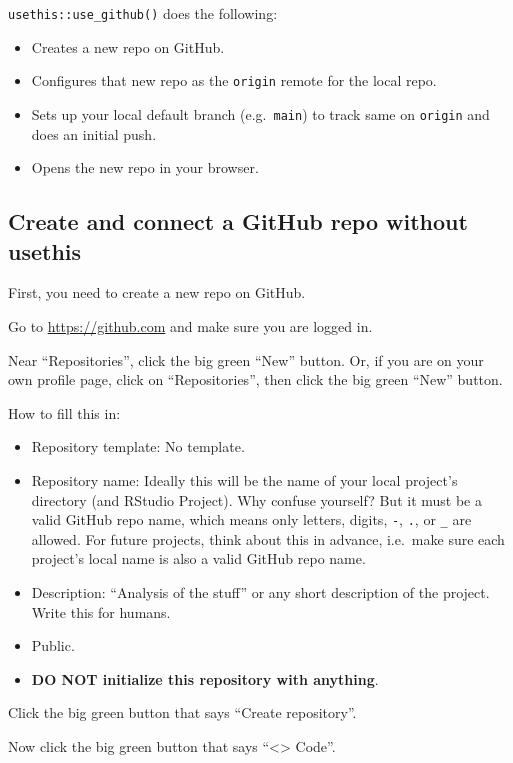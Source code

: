 \documentclass[
]{book}
\providecommand{\tightlist}{%
  \setlength{\itemsep}{0pt}\setlength{\parskip}{0pt}}
\begin{document}
\texttt{usethis::use\_github()} does the following:

\begin{itemize}
\tightlist
\item
  Creates a new repo on GitHub.
\item
  Configures that new repo as the \texttt{origin} remote for the local repo.
\item
  Sets up your local default branch (e.g.~\texttt{main}) to track same on \texttt{origin} and
  does an initial push.
\item
  Opens the new repo in your browser.
\end{itemize}

\subsection{Create and connect a GitHub repo without usethis}\label{create-and-connect-a-github-repo-without-usethis}

First, you need to create a new repo on GitHub.

Go to \url{https://github.com} and make sure you are logged in.

Near ``Repositories'', click the big green ``New'' button.
Or, if you are on your own profile page, click on ``Repositories'', then click the big green ``New'' button.

How to fill this in:

\begin{itemize}
\tightlist
\item
  Repository template: No template.
\item
  Repository name: Ideally this will be the name of your local project's directory (and RStudio Project). Why confuse yourself? But it must be a valid GitHub repo name, which means only letters, digits, \texttt{-}, \texttt{.}, or \texttt{\_} are allowed. For future projects, think about this in advance, i.e.~make sure each project's local name is also a valid GitHub repo name.
\item
  Description: ``Analysis of the stuff'' or any short description of the project. Write this for humans.
\item
  Public.
\item
  \textbf{DO NOT initialize this repository with anything}.
\end{itemize}

Click the big green button that says ``Create repository''.

Now click the big green button that says ``\textless\textgreater{} Code''.
\end{document}
